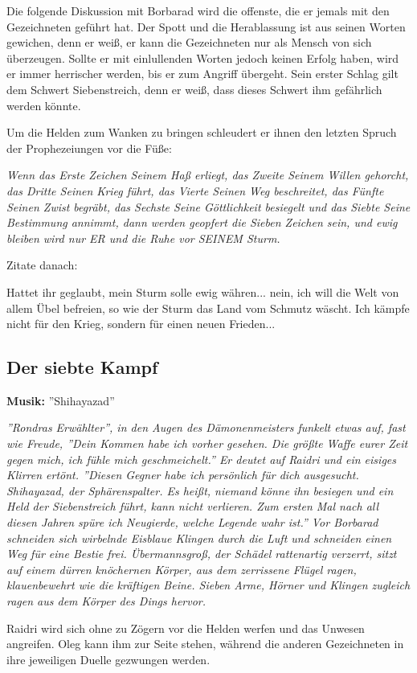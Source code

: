 Die folgende Diskussion mit Borbarad wird die offenste, die er jemals mit den Gezeichneten geführt hat. Der Spott und die Herablassung ist aus seinen Worten gewichen, denn er weiß, er kann die Gezeichneten nur als Mensch von sich überzeugen. Sollte er mit einlullenden Worten jedoch keinen Erfolg haben, wird er immer herrischer werden, bis er zum Angriff übergeht. Sein erster Schlag gilt dem Schwert Siebenstreich, denn er weiß, dass dieses Schwert ihm gefährlich werden könnte.

Um die Helden zum Wanken zu bringen schleudert er ihnen den letzten Spruch der Prophezeiungen vor die Füße:

\emph{Wenn das Erste Zeichen Seinem Haß erliegt, das Zweite Seinem Willen gehorcht, das Dritte Seinen Krieg führt, das Vierte Seinen Weg beschreitet, das Fünfte Seinen Zwist begräbt, das Sechste Seine Göttlichkeit besiegelt und das Siebte Seine Bestimmung annimmt, dann werden geopfert die Sieben Zeichen sein, und ewig bleiben wird nur ER und die Ruhe vor SEINEM Sturm.}

Zitate danach:

Hattet ihr geglaubt, mein Sturm solle ewig währen... nein, ich will die Welt von allem Übel befreien, so wie der Sturm das Land vom Schmutz wäscht. Ich kämpfe nicht für den Krieg, sondern für einen neuen Frieden...

\subsection{Der siebte Kampf}
\textbf{Musik:} ''Shihayazad''

\emph{''Rondras Erwählter'', in den Augen des Dämonenmeisters funkelt etwas auf, fast wie Freude, ''Dein Kommen habe ich vorher gesehen. Die größte Waffe eurer Zeit gegen mich, ich fühle mich geschmeichelt.'' Er deutet auf Raidri und ein eisiges Klirren ertönt. ''Diesen Gegner habe ich persönlich für dich ausgesucht. Shihayazad, der Sphärenspalter. Es heißt, niemand könne ihn besiegen und ein Held der Siebenstreich führt, kann nicht verlieren. Zum ersten Mal nach all diesen Jahren spüre ich Neugierde, welche Legende wahr ist.'' Vor Borbarad schneiden sich wirbelnde Eisblaue Klingen durch die Luft und schneiden einen Weg für eine Bestie frei. Übermannsgroß, der Schädel rattenartig verzerrt, sitzt auf einem dürren knöchernen Körper, aus dem zerrissene Flügel ragen, klauenbewehrt wie die kräftigen Beine. Sieben Arme, Hörner und Klingen zugleich ragen aus dem Körper des Dings hervor.}

Raidri wird sich ohne zu Zögern vor die Helden werfen und das Unwesen angreifen. Oleg kann ihm zur Seite stehen, während die anderen Gezeichneten in ihre jeweiligen Duelle gezwungen werden.


